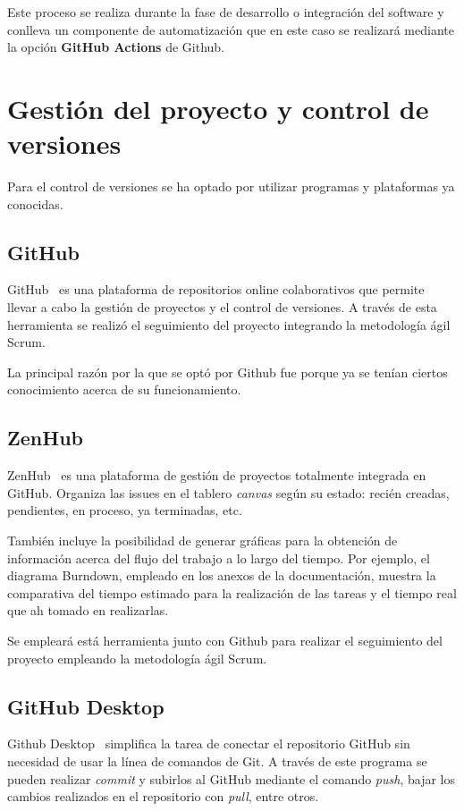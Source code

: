 Este proceso se realiza durante la fase de desarrollo o integración del software y conlleva un componente de automatización que en este caso se realizará mediante la opción \textbf{GitHub Actions} de Github. 

\section{Gestión del proyecto y control de versiones}
Para el control de versiones se ha optado por utilizar programas y plataformas ya conocidas.

\subsection{GitHub}
GitHub~\cite{pagina_github} es una plataforma de repositorios online colaborativos que permite llevar a cabo la gestión de proyectos y el control de versiones. A través de esta herramienta se realizó el seguimiento del proyecto integrando la metodología ágil Scrum.
 
La principal razón por la que se optó por Github fue porque ya se tenían ciertos conocimiento acerca de su funcionamiento. 

\subsection{ZenHub}
ZenHub~\cite{pagina_zenhub} es una plataforma de gestión de proyectos totalmente integrada en GitHub. Organiza las issues en el tablero \emph{canvas} según su estado: recién creadas, pendientes, en proceso, ya terminadas, etc. 

También incluye la posibilidad de generar gráficas para la obtención de información acerca del flujo del trabajo a lo largo del tiempo. Por ejemplo, el diagrama Burndown, empleado en los anexos de la documentación, muestra la comparativa del tiempo estimado para la realización de las tareas y el tiempo real que ah tomado en realizarlas.

Se empleará está herramienta junto con Github para realizar el seguimiento del proyecto empleando la metodología ágil Scrum.

\subsection{GitHub Desktop}
Github Desktop~\cite{pagina_github_desktop} simplifica la tarea de conectar el repositorio GitHub sin necesidad de usar la línea de comandos de Git. A través de este programa se pueden realizar \emph{commit} y subirlos al GitHub mediante el comando \emph{push}, bajar los cambios realizados en el repositorio con \emph{pull}, entre otros. 